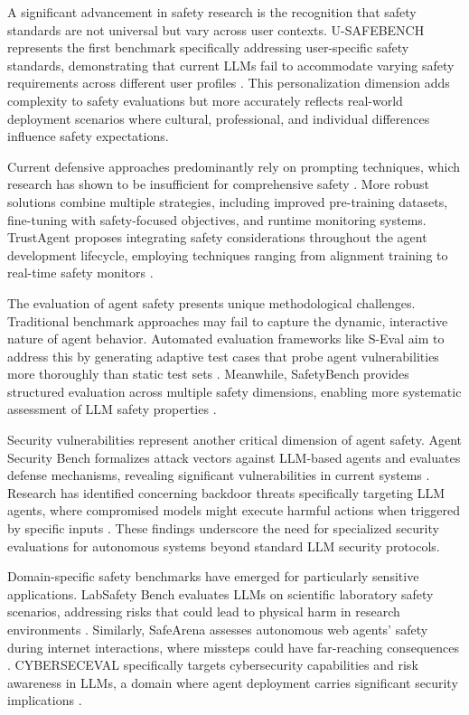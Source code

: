 \documentclass[conference]{IEEEtran}
\begin{document}
A significant advancement in safety research is the recognition that safety standards are not universal but vary across user contexts. U-SAFEBENCH represents the first benchmark specifically addressing user-specific safety standards, demonstrating that current LLMs fail to accommodate varying safety requirements across different user profiles \cite{2502.15086}. This personalization dimension adds complexity to safety evaluations but more accurately reflects real-world deployment scenarios where cultural, professional, and individual differences influence safety expectations.

Current defensive approaches predominantly rely on prompting techniques, which research has shown to be insufficient for comprehensive safety \cite{2412.14470}. More robust solutions combine multiple strategies, including improved pre-training datasets, fine-tuning with safety-focused objectives, and runtime monitoring systems. TrustAgent proposes integrating safety considerations throughout the agent development lifecycle, employing techniques ranging from alignment training to real-time safety monitors \cite{2402.01586}.

The evaluation of agent safety presents unique methodological challenges. Traditional benchmark approaches may fail to capture the dynamic, interactive nature of agent behavior. Automated evaluation frameworks like S-Eval aim to address this by generating adaptive test cases that probe agent vulnerabilities more thoroughly than static test sets \cite{2405.14191}. Meanwhile, SafetyBench provides structured evaluation across multiple safety dimensions, enabling more systematic assessment of LLM safety properties \cite{2309.07045}.

Security vulnerabilities represent another critical dimension of agent safety. Agent Security Bench formalizes attack vectors against LLM-based agents and evaluates defense mechanisms, revealing significant vulnerabilities in current systems \cite{2410.02644}. Research has identified concerning backdoor threats specifically targeting LLM agents, where compromised models might execute harmful actions when triggered by specific inputs \cite{2402.11208}. These findings underscore the need for specialized security evaluations for autonomous systems beyond standard LLM security protocols.

Domain-specific safety benchmarks have emerged for particularly sensitive applications. LabSafety Bench evaluates LLMs on scientific laboratory safety scenarios, addressing risks that could lead to physical harm in research environments \cite{2410.14182}. Similarly, SafeArena assesses autonomous web agents' safety during internet interactions, where missteps could have far-reaching consequences \cite{2503.04957}. CYBERSECEVAL specifically targets cybersecurity capabilities and risk awareness in LLMs, a domain where agent deployment carries significant security implications \cite{2408.01605}.
\end{document}
